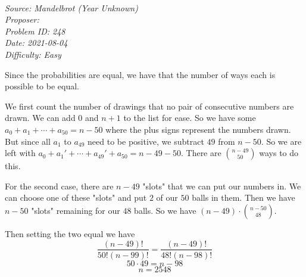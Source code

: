 \SSbreak\\
\emph{Source: Mandelbrot (Year Unknown)}\\
\emph{Proposer: \Ppi}\\
\emph{Problem ID: 248}\\
\emph{Date: 2021-08-04}\\
\emph{Difficulty: Easy}\\
\SSbreak

\bigskip

\begin{solution}\hfil\medskip
 
  Since the probabilities are equal, we have that the number of ways each is possible to be equal.

  We first count the number of drawings that no pair of consecutive numbers are drawn. We can add $0$ and $n+1$ to the list for ease. So we have some $a_0+a_1+\cdots+a_{50} = n-50$ where the plus signs represent the numbers drawn. But since all $a_1$ to $a_{49}$ need to be positive, we subtract $49$ from $n-50$. So we are left with $a_0+a_1'+\cdots+a_{49}'+a_{50} = n-49-50$. There are $\binom{n-49}{50}$ ways to do this. 
  
  For the second case, there are $n-49$ "slots" that we can put our numbers in. We can choose one of these "slots" and put $2$ of our $50$ balls in them. Then we have $n-50$ "slots" remaining for our $48$ balls. So we have $(n-49) \cdot \binom{n-50}{48}$.
  
  Then setting the two equal we have 
  $$\frac{(n-49)!}{50!(n-99)!} = \frac{(n-49)!}{48!(n-98)!}$$
  $$50\cdot49 = n-98$$
  $$n = \boxed{2548}$$

\end{solution}\bigskip
